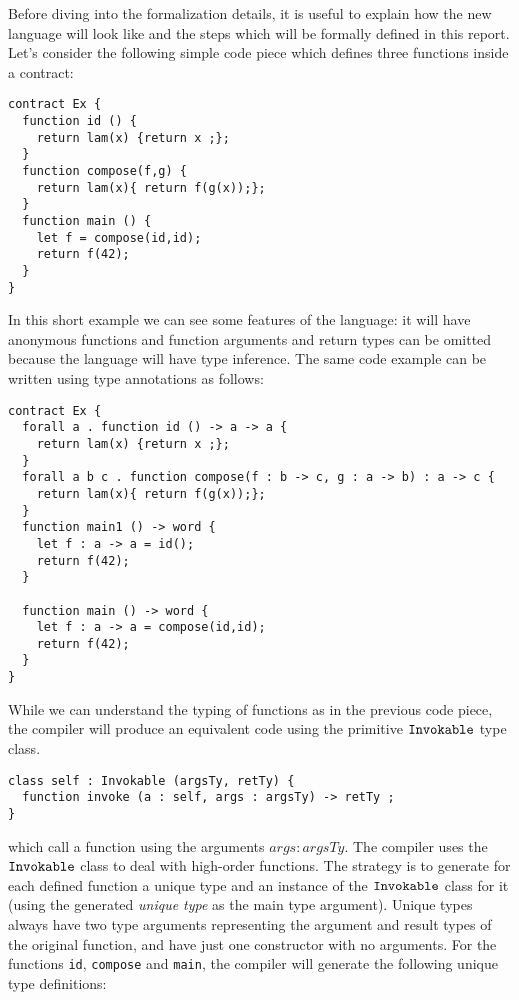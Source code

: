 \documentclass[a4paper, 11pt]{article}
\theoremstyle{definition}
\begin{document}
Before diving into the formalization details, it
is useful to explain how the new language will look like
and the steps which will be formally defined in this
report. Let's consider the following simple code
piece which defines three functions inside a contract:

\begin{lstlisting}[language=solidity]
contract Ex {
  function id () {
    return lam(x) {return x ;};
  }
  function compose(f,g) {
    return lam(x){ return f(g(x));};
  }
  function main () {
    let f = compose(id,id);
    return f(42);
  }
}
\end{lstlisting}

In this short example we can see some features of the \solidity{}
language: it will have anonymous functions and
function arguments and return types can be omitted because
the language will have type inference. The same code
example can be written using type annotations as follows:

\begin{lstlisting}[language=solidity]
contract Ex {
  forall a . function id () -> a -> a {
    return lam(x) {return x ;};
  }
  forall a b c . function compose(f : b -> c, g : a -> b) : a -> c {
    return lam(x){ return f(g(x));};
  }
  function main1 () -> word {
    let f : a -> a = id();
    return f(42);
  }

  function main () -> word {
    let f : a -> a = compose(id,id);
    return f(42);
  }
}
\end{lstlisting}

While we can understand the typing of functions as in the previous
code piece, the \solidity{} compiler will produce an equivalent
code using the primitive $\mathtt{Invokable}$ type class.

\begin{lstlisting}[language=solidity]
class self : Invokable (argsTy, retTy) {
  function invoke (a : self, args : argsTy) -> retTy ;
}
\end{lstlisting}
which call a function using the arguments $args : argsTy$. The compiler
uses the $\mathtt{Invokable}$ class to deal with high-order functions. The
strategy is to generate for each defined function a unique type and an
instance of the $\mathtt{Invokable}$ class for it
(using the generated \emph{unique type} as the main type argument).
Unique types always have two type arguments representing the argument and result types of the original function, and have just one constructor with no arguments.
For the functions \texttt{id}, \texttt{compose} and \texttt{main},
the compiler will generate the following unique type definitions:
\end{document}
